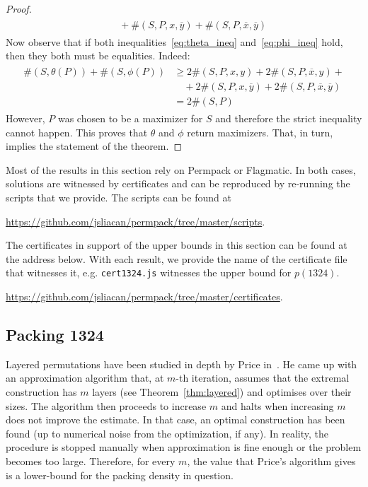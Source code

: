 \documentclass[12pt, a4paper, twoside]{report}
\begin{document}
\begin{proof}
\begin{align}
\begin{aligned}
                &\quad+\#(S,P,x,\overline{y}) + \#(S,P,\overline{x},\overline{y})
              \end{aligned}
    \label{eq:phi_ineq}
\end{align}
Now observe that if both inequalities~\eqref{eq:theta_ineq} and~\eqref{eq:phi_ineq} hold, then they both must be equalities. Indeed:
\begin{align}
  \begin{aligned}
    \#(S,\theta(P)) + \#(S,\phi(P)) &\geq  2\#(S,P,x,y) + 2\#(S,P,\overline{x},y) + \\
                &\quad+2\#(S,P,x,\overline{y}) + 2\#(S,P,\overline{x},\overline{y})\\
                &= 2\#(S,P)
  \end{aligned}
      \label{eq:infactequality}
\end{align}
However, $P$ was chosen to be a maximizer for $S$ and therefore the strict inequality cannot happen. This proves that $\theta$ and $\phi$ return maximizers. That, in turn, implies the statement of the theorem.
\end{proof}

Most of the results in this section rely on Permpack or Flagmatic. In both cases, solutions are witnessed by certificates and can be reproduced by re-running the scripts that we provide. The scripts can be found at

\url{https://github.com/jsliacan/permpack/tree/master/scripts}.

\noindent The certificates in support of the upper bounds in this section can be found at the address below. With each result, we provide the name of the certificate file that witnesses it, e.g. \texttt{cert1324.js} witnesses the upper bound for $p(1324)$.

\url{https://github.com/jsliacan/permpack/tree/master/certificates}.



\subsection{Packing 1324}
Layered permutations have been studied in depth by Price in~\cite{price1997packing}. He came up with an approximation algorithm that, at $m$-th iteration, assumes that the extremal construction has $m$ layers (see Theorem~\ref{thm:layered}) and optimises over their sizes. The algorithm then proceeds to increase $m$ and halts when increasing $m$ does not improve the estimate. In that case, an optimal construction has been found (up to numerical noise from the optimization, if any). In reality, the procedure is stopped manually when approximation is fine enough or the problem becomes too large. Therefore, for every $m$, the value that Price's algorithm gives is a lower-bound for the packing density in question.
\end{document}
